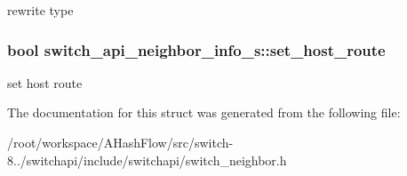 rewrite type \hypertarget{structswitch__api__neighbor__info__s_a574b24b2a4b7b8fa2bec4019f0938238}{
\subsubsection[{set\+\_\+host\+\_\+route}]{\setlength{\rightskip}{0pt plus 5cm}bool switch\+\_\+api\+\_\+neighbor\+\_\+info\+\_\+s\+::set\+\_\+host\+\_\+route}}\label{structswitch__api__neighbor__info__s_a574b24b2a4b7b8fa2bec4019f0938238}
set host route 

The documentation for this struct was generated from the following file\+:\begin{DoxyCompactItemize}
\item 
/root/workspace/\+A\+Hash\+Flow/src/switch-\/8../switchapi/include/switchapi/switch\+\_\+neighbor.\+h\end{DoxyCompactItemize}
